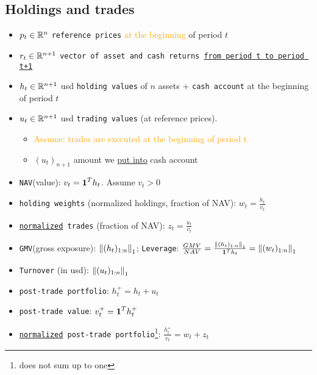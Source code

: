 \newcommand{\holdcost}{\phi^{hold}}
\newcommand{\holdcostnorm}{\phi^{hold.n}}
\newcommand{\tradecost}{\phi^{trade}}
\newcommand{\tradecostnorm}{\phi^{trade.n}}

\subsection{Holdings and trades}
\begin{itemize}
	\item $p_t \in \mathbb{R}^n$ \texttt{reference prices} \textcolor{orange}{at the beginning} of period $t$
	\item $r_t \in \mathbb{R}^{n+1}$ \texttt{vector of asset and cash returns \underline{from period t to period t+1}}
	\item $h_t \in \mathbb{R}^{n+1}$ usd \texttt{holding values} of $n$ assets + \texttt{cash account} at the beginning of period $t$
	\item $u_t \in \mathbb{R}^{n+1}$ usd \texttt{trading values} (at reference prices). 
	\begin{itemize}[label=$\star$]
		\item \textcolor{orange}{Assume: trades are executed at the beginning of period t}
		\item $(u_t)_{n+1}$ amount we \underline{put into} cash account
	\end{itemize}
	\item \texttt{NAV}(value): $ v_t = \textbf{1}^T h_t $. Assume $v_t > 0$
	\item \texttt{holding weights} (normalized holdings, fraction of NAV): $w_t = \frac{h_t}{v_t}$
	\item \texttt{\underline{normalized} trades} (fraction of NAV): $z_t = \frac{u_t}{v_t}$
	\item \texttt{GMV}(gross exposure): $\left\| (h_t)_{1:n} \right\|_1$; \texttt{Leverage}: $\frac{GMV}{NAV}=\frac{\left\| (h_t)_{1:n} \right\|_1}{\textbf{1}^T h_t} = \left\| (w_t)_{1:n} \right\|_1$
	\item \texttt{Turnover} (in usd): $\left\| (u_t)_{1:n} \right\|_1$
	\item \texttt{post-trade portfolio}: $h_t^+ = h_t + u_t$
	\item \texttt{post-trade value}: $v_t^+ = \textbf{1}^T h_t^+$
	\item \texttt{\underline{normalized} post-trade portfolio}\footnote{does not sum up to one}: $\frac{h_t^+}{v_t} = w_t + z_t$
\end{itemize}
